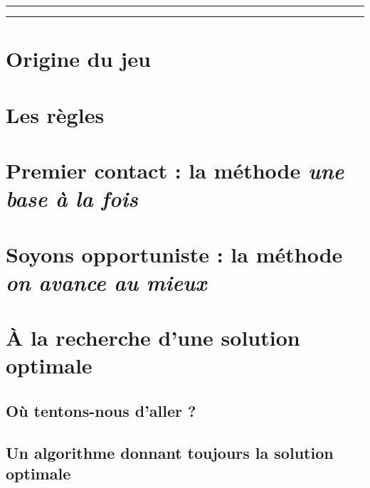 \documentclass[a4,11pt]{article}
\begin{document}

\vspace{3cm}

\hrule

\tableofcontents

\vspace{4ex}

\hrule

\newpage



\section{Origine du jeu}    %
    


\section{Les règles}    %
    


\section{Premier contact : la méthode \textit{\og une base à la fois \fg}}    %
    


\section{Soyons opportuniste : la méthode \textit{\og on avance au mieux \fg}}    %
    


\section{À la recherche d'une solution optimale}
	\subsection{Où tentons-nous d'aller ?}    %
    	
%
	\subsection{Un algorithme donnant toujours la solution optimale}
\end{document}
